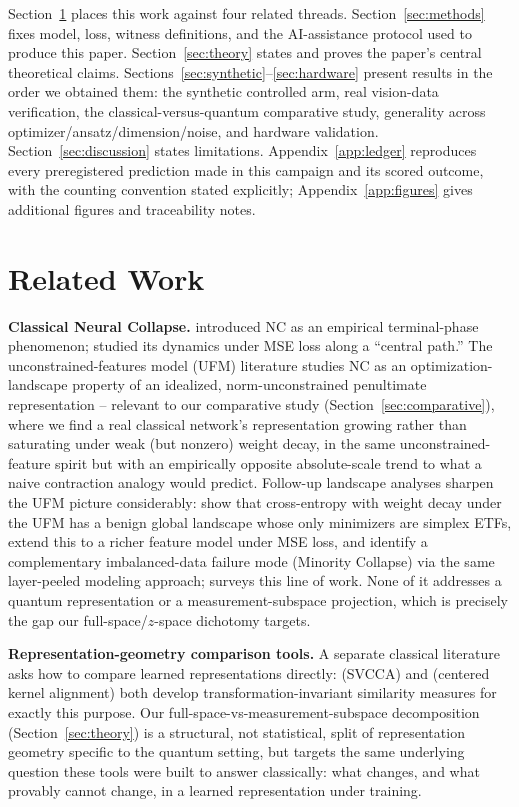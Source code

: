 \documentclass[pdflatex,sn-mathphys-ay]{sn-jnl}
\theoremstyle{thmstyleone}
\theoremstyle{thmstyletwo}
\begin{document}
Section~\ref{sec:related} places this work against four related threads. Section~\ref{sec:methods} fixes model, loss, witness definitions, and the AI-assistance protocol used to produce this paper. Section~\ref{sec:theory} states and proves the paper's central theoretical claims. Sections~\ref{sec:synthetic}--\ref{sec:hardware} present results in the order we obtained them: the synthetic controlled arm, real vision-data verification, the classical-versus-quantum comparative study, generality across optimizer/ansatz/dimension/noise, and hardware validation. Section~\ref{sec:discussion} states limitations. Appendix~\ref{app:ledger} reproduces every preregistered prediction made in this campaign and its scored outcome, with the counting convention stated explicitly; Appendix~\ref{app:figures} gives additional figures and traceability notes.

\section{Related Work}
\label{sec:related}

\textbf{Classical Neural Collapse.} \citet{papyan2020} introduced NC as an empirical terminal-phase phenomenon; \citet{han2022} studied its dynamics under MSE loss along a ``central path.'' The unconstrained-features model (UFM) literature \citep{mixon2022,yang2022} studies NC as an optimization-landscape property of an idealized, norm-unconstrained penultimate representation -- relevant to our comparative study (Section~\ref{sec:comparative}), where we find a real classical network's representation growing rather than saturating under weak (but nonzero) weight decay, in the same unconstrained-feature spirit but with an empirically opposite absolute-scale trend to what a naive contraction analogy would predict. Follow-up landscape analyses sharpen the UFM picture considerably: \citet{zhu2021} show that cross-entropy with weight decay under the UFM has a benign global landscape whose only minimizers are simplex ETFs, \citet{tirer2022} extend this to a richer feature model under MSE loss, and \citet{fang2021} identify a complementary imbalanced-data failure mode (Minority Collapse) via the same layer-peeled modeling approach; \citet{kothapalli2023} surveys this line of work. None of it addresses a quantum representation or a measurement-subspace projection, which is precisely the gap our full-space/$z$-space dichotomy targets.

\textbf{Representation-geometry comparison tools.} A separate classical literature asks how to compare learned representations directly: \citet{raghu2017} (SVCCA) and \citet{kornblith2019} (centered kernel alignment) both develop transformation-invariant similarity measures for exactly this purpose. Our full-space-vs-measurement-subspace decomposition (Section~\ref{sec:theory}) is a structural, not statistical, split of representation geometry specific to the quantum setting, but targets the same underlying question these tools were built to answer classically: what changes, and what provably cannot change, in a learned representation under training.
\end{document}
